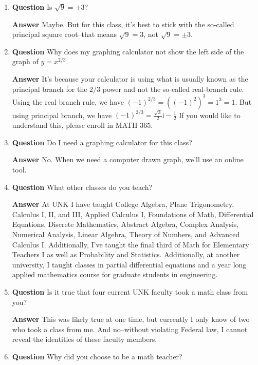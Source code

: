 \documentclass[12pt]{article}
\newcounter{ex}\setcounter{ex}{0}
\begin{document}
\begin{enumerate}
\item  \textbf{Question} Is \(\sqrt{9} = \pm 3\)?

  \textbf{Answer}  Maybe.  But for this class, it's best to stick with the so-called principal square root--that means \(\sqrt{9} = 3\), not  \(\sqrt{9} = \pm 3\).

\item  \textbf{Question} Why does my graphing calculator not show the left side of the graph of \(y = x^{2/3}\). 

\textbf{Answer} It's because your calculator is using what is usually known as the principal branch for the \(2/3\) power and not the so-called real-branch rule.  Using the real branch rule,
we have \((-1)^{2/3} = ((-1)^2)^3 = 1^3 = 1\). But using principal branch, we have \((-1)^{2/3} = \frac{\sqrt{3}}{2}  \mathrm{i}  -\frac{1}{2}\) If you would like to understand this, please enroll in MATH 365.

\item \textbf{Question} Do I need a graphing calculator for this class?

\textbf{Answer} No. When we need a computer drawn graph, we'll use an online tool.

\item \textbf{Question} What other classes do you teach?

\textbf{Answer} At UNK I have taught College Algebra, 
   Plane Trigonometry, Calculus I, II, and III, Applied Calculus I,
   Foundations of Math, Differential Equations, Discrete Mathematics, Abstract Algebra, Complex Analysis,
   Numerical Analysis, Linear Algebra, Theory of Numbers, and Advanced Calculus I. Additionally, I've
   taught the final third of Math for Elementary Teachers I as well as  Probability and Statistics.
   Additionally, at another university, I taught classes in partial differential equations and a
   year long applied mathematics course for graduate students in engineering.

\item  \textbf{Question} Is it true that four current UNK faculty took a math class from you?

 \textbf{Answer}  This was likely true at one time, but currently I only know of two who 
 took a class from me. And no--without violating Federal law, I cannot reveal the identities of
 these faculty members.

\item  \textbf{Question} Why did you choose to be a math teacher?


\end{enumerate}
\end{document}
